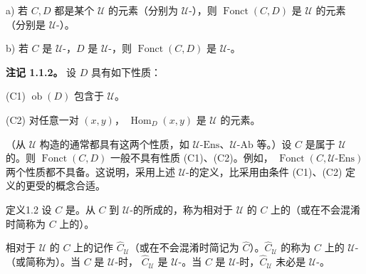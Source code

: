  a) 若 $C,D$ 都是某个 $\mathcal U$ 的元素（分别为 $\mathcal U$-），则 $\operatorname{Fonct}(C,D)$ 是 $\mathcal U$ 的元素（分别是 $\mathcal U$-）。

 b) 若 $C$ 是 $\mathcal U$-，$D$ 是 $\mathcal U$-，则 $\operatorname{Fonct}(C,D)$ 是 $\mathcal U$-。

\textbf{注记 1.1.2。} 设 $D$ 具有如下性质：

(C1)  $\operatorname{ob}(D)$ 包含于 $\mathcal U$。

(C2) 对任意一对 $(x,y)$， $\operatorname{Hom}_D(x,y)$ 是 $\mathcal U$ 的元素。

（从 $\mathcal U$ 构造的通常都具有这两个性质，如 $\mathcal U\text{-}\mathrm{Ens}$、$\mathcal U\text{-}\mathrm{Ab}$ 等。）设 $C$ 是属于 $\mathcal U$ 的。则 $\operatorname{Fonct}(C,D)$ 一般不具有性质 (C1)、(C2)。例如， $\operatorname{Fonct}(C,\mathcal U\text{-}\mathrm{Ens})$ 两个性质都不具备。这说明，采用上述 $\mathcal U$-的定义，比采用由条件 (C1)、(C2) 定义的更受的概念合适。
\begin{SGAresult}{定义}{1.2}
设 $C$ 是。从 $C$ 到 $\mathcal U$-的所成的，称为相对于 $\mathcal U$ 的 $C$ 上的（或在不会混淆时简称为 $C$ 上的）。
\end{SGAresult}
相对于 $\mathcal U$ 的 $C$ 上的记作 $\widehat C_{\mathcal U}$（或在不会混淆时简记为 $\widehat C$）。$\widehat C_{\mathcal U}$ 的称为 $C$ 上的 $\mathcal U$-（或简称为）。当 $C$ 是 $\mathcal U$-时， $\widehat C_{\mathcal U}$ 是 $\mathcal U$-。当 $C$ 是 $\mathcal U$-时，$\widehat C_{\mathcal U}$ 未必是 $\mathcal U$-。
